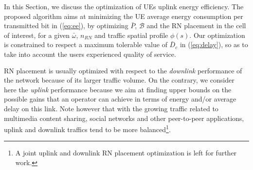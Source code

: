 \documentclass[draftcls,onecolumn]{IEEEtran}
\theoremstyle{plain}
\theoremstyle{definition}
\newcommand{\bbbp}{{\rm I\!P}}
\begin{document}
\def\Pr{\mbox{Pr}} \def\bbbp{\mathbb{P}}
\def\Pr{\bbbp}

\def\proposal{r} \def\acceptance{\Xi}

In this Section, we discuss the optimization of UEs uplink energy efficiency. 
The proposed algorithm aims at minimizing the UE average energy consumption per transmitted bit in (\ref{eq:ee}), by optimizing $\bar{P}$, $\mathcal{B}$ and the RN placement in the cell of interest, for a given $\bar{\omega}$, $n_{RN}$ and traffic spatial profile $\phi(s)$. Our optimization is constrained to respect a maximum tolerable value of $\bar{D}_c$ in (\ref{eq:delay}), so as to take into account the users experienced quality of service. 

RN placement is usually optimized with respect to the {\it downlink} performance of the network because of its larger traffic volume. On the contrary, we consider here the {\it uplink} performance because we aim at finding upper bounds on the possible gains that an operator can achieve in terms of energy and/or average delay on this link. Note however that with the growing traffic related to multimedia content sharing, social networks and other peer-to-peer applications, uplink and downlink traffics tend to be more balanced\footnote{A joint uplink and downlink RN placement optimization is left for further work.}. 
  
\end{document}
